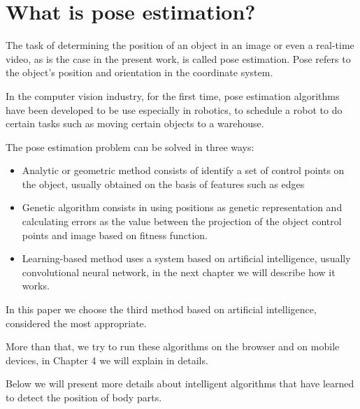 \section{What is pose estimation?}

The task of determining the position of an object in an image 
or even a real-time video, as is the case in the present work, is called pose estimation.
Pose refers to the object’s position and orientation in the coordinate system.

In the computer vision industry, for the first time, pose estimation algorithms 
have been developed to be use especially in robotics, to schedule a robot to 
do certain tasks such as moving certain objects to a warehouse. \cite{book.computer.vision.2001}

The pose estimation problem can be solved in three ways:
\begin{itemize}
  \item Analytic or geometric method consists of identify a set of control points 
    on the object, usually obtained on the basis of features such as edges
  \item Genetic algorithm consists in using positions as genetic representation and calculating errors
   as the value between the projection of the object control points and image based on fitness function.
 
 \item Learning-based  method uses a system based on artificial intelligence, usually convolutional neural network,
 in the next chapter we will describe how it works.
\end{itemize} 

In this paper we choose the third method based on artificial intelligence, considered the most appropriate.

More than that, we try to run these algorithms on the browser and on mobile devices, 
 in Chapter 4 we will explain in details.

Below we will present more details about intelligent algorithms that have learned to detect the position of body parts.